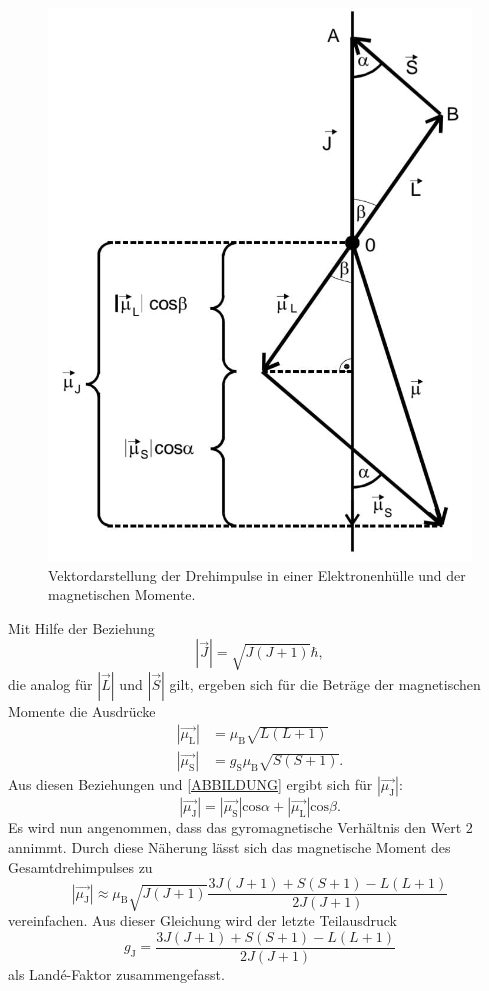 \begin{figure}[H]
	\centering
	\includegraphics[width=0.6\linewidth]{data/vektordiagramm.jpeg}
	\caption{Vektordarstellung der Drehimpulse in einer Elektronenhülle und der magnetischen Momente.}
	\label{fig:vektordarstellung}
\end{figure}

Mit Hilfe der Beziehung
\begin{equation*}
\left|\vec{J}\right| = \sqrt{J(J+1)}\hbar,
\end{equation*}
die analog für $\left|\vec{L}\right|$ und $\left|\vec{S}\right|$ gilt, ergeben sich für die Beträge der magnetischen Momente die Ausdrücke
\begin{align}
\label{eq:eq3}
\left|\vec{\mu_\text{L}}\right| &= \mu_\text{B}\sqrt{L(L+1)} \\
\left|\vec{\mu_\text{S}}\right| &= g_\text{S}\mu_\text{B}\sqrt{S(S+1)}.
\end{align}
Aus diesen Beziehungen und \autoref{ABBILDUNG} ergibt sich für $\left|\vec{\mu_\text{J}}\right|$:
\begin{equation}
\left|\vec{\mu_\text{J}}\right| = \left|\vec{\mu_\text{S}}\right|\text{cos}\alpha + \left|\vec{\mu_\text{L}}\right|\text{cos}\beta.
\end{equation}
Es wird nun angenommen, dass das gyromagnetische Verhältnis den Wert $2$ annimmt. Durch diese Näherung lässt sich das magnetische Moment des Gesamtdrehimpulses zu
\begin{equation}
\label{eq:eq4}
\left|\vec{\mu_\text{J}}\right| \approx \mu_\text{B} \sqrt{J(J+1)} \frac{3J(J+1)+S(S+1)-L(L+1)}{2J(J+1)}
\end{equation}
vereinfachen. Aus dieser Gleichung wird der letzte Teilausdruck
\begin{equation}
	\label{eqn:landeF}
	g_\text{J} = \frac{3J(J+1)+S(S+1)-L(L+1)}{2J(J+1)}
\end{equation}
als Landé-Faktor zusammengefasst.

